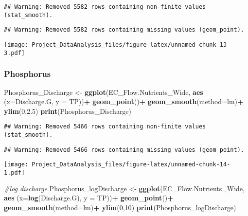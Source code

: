 \documentclass[]{article}
\newenvironment{Shaded}{\begin{snugshade}}{\end{snugshade}}
\newcommand{\CommentTok}[1]{\textcolor[rgb]{0.56,0.35,0.01}{\textit{#1}}}
\newcommand{\DataTypeTok}[1]{\textcolor[rgb]{0.13,0.29,0.53}{#1}}
\newcommand{\DecValTok}[1]{\textcolor[rgb]{0.00,0.00,0.81}{#1}}
\newcommand{\FloatTok}[1]{\textcolor[rgb]{0.00,0.00,0.81}{#1}}
\newcommand{\KeywordTok}[1]{\textcolor[rgb]{0.13,0.29,0.53}{\textbf{#1}}}
\newcommand{\NormalTok}[1]{#1}
\newcommand{\OperatorTok}[1]{\textcolor[rgb]{0.81,0.36,0.00}{\textbf{#1}}}
\newcommand{\StringTok}[1]{\textcolor[rgb]{0.31,0.60,0.02}{#1}}
\begin{document}
\begin{verbatim}
## Warning: Removed 5582 rows containing non-finite values (stat_smooth).
\end{verbatim}

\begin{verbatim}
## Warning: Removed 5582 rows containing missing values (geom_point).
\end{verbatim}

\texttt{[image: Project\_DataAnalysis\_files/figure-latex/unnamed-chunk-13-3.pdf]}

\hypertarget{phosphorus-3}{%
\subsubsection{Phosphorus}\label{phosphorus-3}}

\begin{Shaded}
\begin{Highlighting}[]
\NormalTok{Phosphorus_Discharge <-}\StringTok{ }
\StringTok{  }\KeywordTok{ggplot}\NormalTok{(EC_Flow.Nutrients_Wide, }\KeywordTok{aes}\NormalTok{ (}\DataTypeTok{x=}\NormalTok{Discharge.G, }\DataTypeTok{y =}\NormalTok{ TP))}\OperatorTok{+}
\StringTok{  }\KeywordTok{geom_point}\NormalTok{()}\OperatorTok{+}
\StringTok{  }\KeywordTok{geom_smooth}\NormalTok{(}\DataTypeTok{method=}\NormalTok{lm)}\OperatorTok{+}
\StringTok{  }\KeywordTok{ylim}\NormalTok{(}\DecValTok{0}\NormalTok{,}\FloatTok{2.5}\NormalTok{)}
\KeywordTok{print}\NormalTok{(Phosphorus_Discharge)}
\end{Highlighting}
\end{Shaded}

\begin{verbatim}
## Warning: Removed 5466 rows containing non-finite values (stat_smooth).
\end{verbatim}

\begin{verbatim}
## Warning: Removed 5466 rows containing missing values (geom_point).
\end{verbatim}

\texttt{[image: Project\_DataAnalysis\_files/figure-latex/unnamed-chunk-14-1.pdf]}

\begin{Shaded}
\begin{Highlighting}[]
\CommentTok{#log discharge }
\NormalTok{Phosphorus_logDischarge <-}\StringTok{ }
\StringTok{  }\KeywordTok{ggplot}\NormalTok{(EC_Flow.Nutrients_Wide, }\KeywordTok{aes}\NormalTok{ (}\DataTypeTok{x=}\KeywordTok{log}\NormalTok{(Discharge.G), }\DataTypeTok{y =}\NormalTok{ TP))}\OperatorTok{+}
\StringTok{  }\KeywordTok{geom_point}\NormalTok{()}\OperatorTok{+}
\StringTok{  }\KeywordTok{geom_smooth}\NormalTok{(}\DataTypeTok{method=}\NormalTok{lm)}\OperatorTok{+}
\StringTok{  }\KeywordTok{ylim}\NormalTok{(}\DecValTok{0}\NormalTok{,}\DecValTok{10}\NormalTok{)}
\KeywordTok{print}\NormalTok{(Phosphorus_logDischarge)}
\end{Highlighting}
\end{Shaded}
\end{document}
